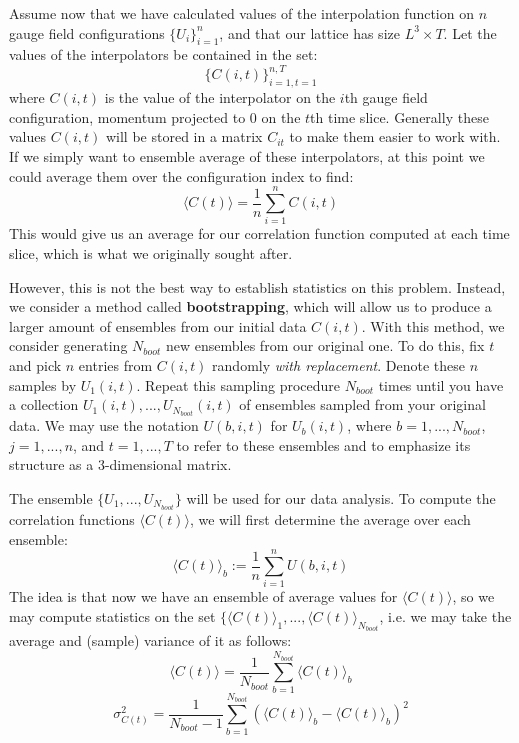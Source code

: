 \documentclass[11pt, oneside]{article}   	%
\theoremstyle{definition}
\begin{document}
Assume now that we have calculated values of the interpolation function on $n$ gauge field configurations 
$\{U_i\}_{i = 1}^n$, and that our lattice has size $L^3\times T$. Let the values of the interpolators be 
contained in the set:
\begin{equation}
	\{C(i, t)\}_{i = 1, t = 1}^{n, T}
\end{equation}
where $C(i, t)$ is the value of the interpolator on the $i$th gauge field configuration, momentum projected 
to 0 on the $t$th time slice. Generally these values $C(i, t)$ will be stored in a matrix $C_{it}$ to make them 
easier to work with. If we simply want to ensemble average of these interpolators, at this point we could 
average them over the configuration index to find:
\begin{equation}
	\langle C(t)\rangle = \frac{1}{n}\sum_{i = 1}^n C(i, t)
\end{equation}
This would give us an average for our correlation function computed at each time slice, which is what we 
originally sought after.

However, this is not the best way to establish statistics on this problem. Instead, we consider a method 
called \textbf{bootstrapping}, which will allow us to produce a larger amount of ensembles from our 
initial data $C(i, t)$. With this method, we consider generating $N_{boot}$ new ensembles from our 
original one. To do this, fix $t$ and pick $n$ entries from $C(i, t)$ randomly \textit{with replacement}. 
Denote these $n$ samples by $U_1(i, t)$. Repeat this sampling procedure $N_{boot}$ times until 
you have a collection $U_1(i, t), ..., U_{N_{boot}}(i, t)$ of ensembles sampled from your original data. 
We may use the notation $U(b, i, t)$ for $U_b(i, t)$, where $b = 1, ..., N_{boot}$, $j = 1, ..., n$, and $t = 
1, ..., T$ to refer to these ensembles and to emphasize its structure as a 3-dimensional matrix. 

The ensemble $\{U_1, ..., U_{N_{boot}}\}$ will be used for our data analysis. To compute the correlation 
functions $\langle C(t)\rangle$, we will first determine the average over each ensemble:
\begin{equation}
	\langle C(t)\rangle_b := \frac{1}{n}\sum_{i = 1}^n U(b, i, t)
\end{equation}
The idea is that now we have an ensemble of average values for $\langle C(t)\rangle$, so we may compute 
statistics on the set $\{\langle C(t)\rangle_1, ..., \langle C(t)\rangle_{N_{boot}}$, i.e. we may take 
the average and (sample) variance of it as follows:
\begin{equation}
	\langle C(t)\rangle = \frac{1}{N_{boot}}\sum_{b = 1}^{N_{boot}}\langle C(t)\rangle_b
\end{equation}
\begin{equation}
	\sigma_{C(t)}^2 = \frac{1}{N_{boot} - 1}\sum_{b = 1}^{N_{boot}} (\langle C(t)\rangle_b - \langle C(t)
	\rangle_b)^2
\end{equation}
\end{document}
